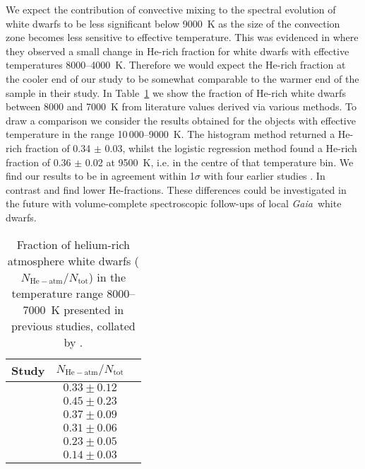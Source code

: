 \documentclass[a4paper,fleqn,usenatbib]{mnras}
\newcommand{\gaia}{{\it Gaia}}
\begin{document}
We expect the contribution of convective mixing to the spectral evolution of white dwarfs to be less significant below 9000~K as the size of the convection zone becomes less sensitive to effective temperature. This was evidenced in \citet{blouin19} where they observed a small change in He-rich fraction for white dwarfs with effective temperatures 8000--4000~K. Therefore we would expect the He-rich fraction at the cooler end of our study to be somewhat comparable to the warmer end of the sample in their study.  In Table~\ref{tb:blouin-values} we show the fraction of He-rich white dwarfs between 8000 and 7000~K from literature values derived via various methods. To draw a comparison we consider the results obtained for the objects with effective temperature in the range 10\,000--9000~K. The histogram method returned a He-rich fraction of 0.34 $\pm$ 0.03, whilst the logistic regression method found a He-rich fraction of 0.36 $\pm$ 0.02 at 9500~K, i.e. in the centre of that temperature bin. We find our results to be in agreement within 1$\sigma$ with four earlier studies \citep{bergeron97,leggett98,bergeron01,tremblay08}. In contrast \citet{limoges15} and \citet{blouin19} find lower He-fractions. These differences could be investigated in the future with volume-complete spectroscopic follow-ups of local \gaia\ white dwarfs.

\begin{table}
	\centering
        \caption{Fraction of helium-rich atmosphere white dwarfs ($N_{\mathrm{He-atm}}/N_{\mathrm{tot}}$) in the temperature range 8000--7000~K presented in previous studies, collated by \citet{blouin19}.}
        \label{tab:grid}
        \begin{tabular}{lcc}
                Study & $N_{\mathrm{He-atm}}/N_{\mathrm{tot}}$\\ 
                \hline
                \cite{bergeron97} & $0.33 \pm 0.12$ \\
                \cite{leggett98}  & $0.45 \pm 0.23$ \\
                \cite{bergeron01} & $0.37 \pm 0.09$ \\
                \cite{tremblay08} & $0.31 \pm 0.06$ \\ 
                \cite{limoges15}  & $0.23 \pm 0.05$ \\
                \cite{blouin19}   & $0.14 \pm 0.03$ \\
                \hline
        \end{tabular}
        \label{tb:blouin-values}\\
\end{table}
\end{document}
